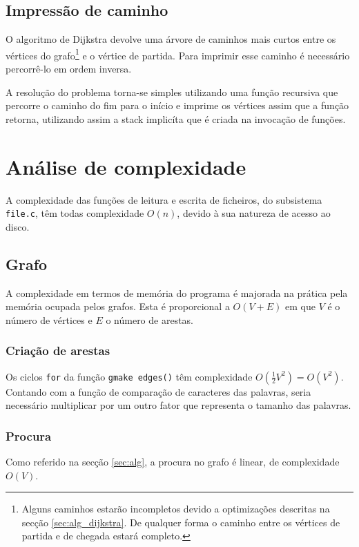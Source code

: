 \documentclass[portuguese, a4paper]{article}
\newcommand\tu[0]{\textunderscore}
\begin{document}
	\subsection{Impressão de caminho}
	\par
	O algoritmo de Dijkstra devolve uma árvore de caminhos mais curtos entre os
	vértices do grafo\footnote{Alguns caminhos estarão incompletos devido a
	optimizações descritas na secção \ref{sec:alg_dijkstra}. De qualquer forma o
	caminho entre os vértices de partida e de chegada estará completo.} e o vértice
	de partida. Para imprimir esse caminho é necessário percorrê-lo em ordem
	inversa.
	\par
	A resolução do problema torna-se simples utilizando uma função
	recursiva que percorre o caminho do fim para o início e imprime os vértices
	assim que a função retorna, utilizando assim a stack implicíta que é criada
	na invocação de funções.


\section{Análise de complexidade}
	\par
	A complexidade das funções de leitura e escrita de ficheiros, do subsistema \texttt{file.c}, têm todas complexidade $O(n)$, devido à sua natureza de acesso ao disco.

	\subsection{Grafo}
	\par
	A complexidade em termos de memória do programa é majorada na prática pela
	memória ocupada pelos grafos. Esta é proporcional a $O(V + E)$ em que $V$ é
	o número de vértices e $E$ o número de arestas.

	\subsubsection{Criação de arestas}
	\par
	Os ciclos \texttt{for} da função \texttt{g\tu make\ edges()} têm
	complexidade $O(\frac{1}{2}V^2) = O(V^2)$. Contando com a função de
	comparação de caracteres das palavras, seria necessário multiplicar por um
	outro fator que representa o tamanho das palavras.

	\subsubsection{Procura}
	\par
	Como referido na secção \ref{sec:alg}, a procura no grafo é linear, de
	complexidade $O(V)$.
\end{document}
